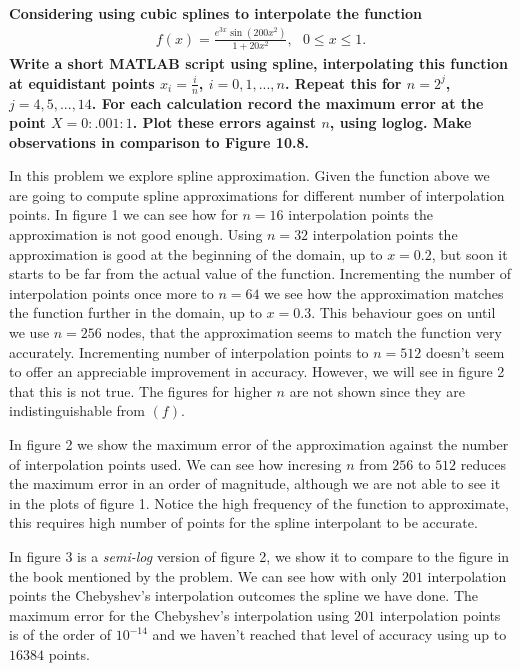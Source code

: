 \textbf{Considering using cubic splines to interpolate the function
\begin{align*}
f(x)=\frac{e^{3x}\sin(200x^2)}{1+20x^2},~~~0\leq x\leq 1.
\end{align*}
Write a short MATLAB script using spline, interpolating this function at equidistant points $x_i =\frac{i}{n}$, $i =0,1,...,n$. Repeat this for $n = 2^j$, $j = 4, 5, . . . , 14$. For each calculation record the maximum error at the point $X = 0 : .001 : 1$. Plot these errors against $n$, using loglog.
Make observations in comparison to Figure 10.8.}

\vspace{0.3in}

In this problem we explore spline approximation. Given the function above we are going to compute spline approximations for different number of interpolation points. In figure 1 we can see how for $n=16$ interpolation points the approximation is not good enough. Using $n=32$ interpolation points the approximation is good at the beginning of the domain, up to $x=0.2$, but soon it starts to be far from the actual value of the function. Incrementing the number of interpolation points once more to $n=64$ we see how the approximation matches the function further in the domain, up to $x=0.3$. This behaviour goes on until we use $n=256$ nodes, that the approximation seems to match the function very accurately. Incrementing number of interpolation points to $n=512$ doesn't seem to offer an appreciable improvement in accuracy. However, we will see in figure 2 that this is not true. The figures for higher $n$ are not shown since they are indistinguishable from $(f)$.

In figure 2 we show the maximum error of the approximation against the number of interpolation points used. We can see how incresing $n$ from $256$ to $512$ reduces the maximum error in an order of magnitude, although we are not able to see it in the plots of figure 1. Notice the high frequency of the function to approximate, this requires high number of points for the spline interpolant to be accurate.

In figure 3 is a \textit{semi-log} version of figure 2, we show it to compare to the figure in the book mentioned by the problem. We can see how with only $201$ interpolation points the Chebyshev's interpolation outcomes the spline we have done. The maximum error for the Chebyshev's interpolation using $201$ interpolation points is of the order of $10^{-14}$ and we haven't reached that level of accuracy using up to $16384$ points.

